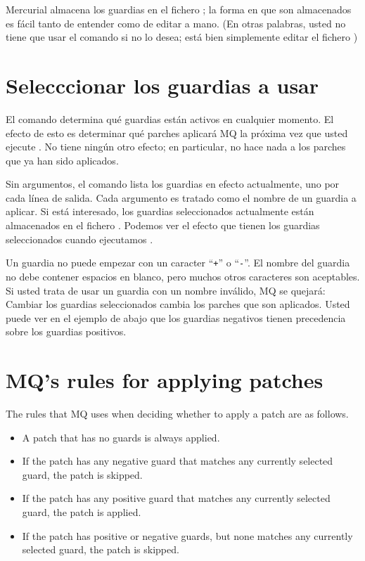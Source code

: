 Mercurial almacena los guardias en el fichero ; la
forma en que son almacenados es fácil tanto de entender como de editar
a mano. (En otras palabras, usted no tiene que usar el comando
 si no lo desea; está bien simplemente editar el
fichero )

\section{Selecccionar los guardias a usar}

El comando  determina qué guardias están activos
en cualquier momento. El efecto de esto es determinar qué parches
aplicará MQ la próxima vez que usted ejecute .  No
tiene ningún otro efecto; en particular, no hace nada a los parches
que ya han sido aplicados.

Sin argumentos, el comando  lista los guardias en
efecto actualmente, uno por cada línea de salida. Cada argumento es
tratado como el nombre de un guardia a aplicar.
Si está interesado, los guardias seleccionados actualmente están
almacenados en el fichero .
Podemos ver el efecto que tienen los guardias seleccionados cuando
ejecutamos .

Un guardia no puede empezar con un  caracter ``\texttt{+}'' o
``\texttt{-}''. El nombre del guardia no debe contener espacios en
blanco, pero muchos otros caracteres son aceptables. Si usted trata de
usar un guardia con un nombre inválido, MQ se quejará:
Cambiar los guardias seleccionados cambia los parches que son
aplicados.
Usted puede ver en el ejemplo de abajo que los guardias negativos
tienen precedencia sobre los guardias positivos.

\section{MQ's rules for applying patches}

The rules that MQ uses when deciding whether to apply a patch
are as follows.
\begin{itemize}
\item A patch that has no guards is always applied.
\item If the patch has any negative guard that matches any currently
  selected guard, the patch is skipped.
\item If the patch has any positive guard that matches any currently
  selected guard, the patch is applied.
\item If the patch has positive or negative guards, but none matches
  any currently selected guard, the patch is skipped.
\end{itemize}

